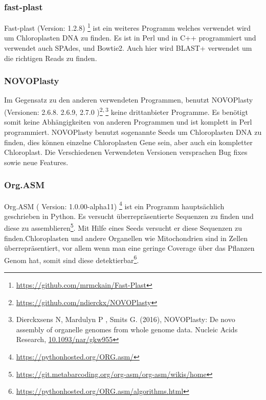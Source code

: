 \documentclass{scrartcl}
\begin{document}
\subsubsection{fast-plast}
\label{sec-2-5-2}
Fast-plast  (Version: 1.2.8) \footnote{\url{https://github.com/mrmckain/Fast-Plast}} ist ein weiteres Programm welches verwendet wird um Chloroplasten DNA zu finden. Es ist in Perl und in C++ programmiert und verwendet auch SPAdes, 
und Bowtie2\footnotemark[19]{}. Auch hier wird BLAST+\footnotemark[22]{} verwendet um die richtigen Reads zu finden. 
\subsubsection{NOVOPlasty}
\label{sec-2-5-3}
Im Gegensatz zu den anderen verwendeten Programmen, benutzt NOVOPlasty (Versionen: 2.6.8. 2.6.9, 2.7.0 )\footnote{\url{https://github.com/ndierckx/NOVOPlasty}}\textsuperscript{,}\,\footnote{Dierckxsens N, Mardulyn P , Smits G. (2016), NOVOPlasty: De novo assembly of organelle genomes from whole genome data. Nucleic Acids Research, \url{10.1093/nar/gkw955}} keine drittanbieter Programme. Es benötigt somit keine Abhängigkeiten von anderen Programmen
und ist komplett in Perl programmiert. NOVOPlasty benutzt sogenannte Seeds um Chloroplasten DNA zu finden, dies können einzelne Chloroplasten Gene sein, aber auch ein kompletter Chloroplast.
Die Verschiedenen Verwendeten Versionen versprachen Bug fixes sowie neue Features. 
\subsubsection{Org.ASM}
\label{sec-2-5-4}
Org.ASM ( Version: 1.0.00-alpha11) \footnote{\url{https://pythonhosted.org/ORG.asm/}} ist ein Programm hauptsächlich geschrieben in Python. Es versucht überrepräsentierte Sequenzen zu finden und diese zu assemblieren\footnote{\url{https://git.metabarcoding.org/org-asm/org-asm/wikis/home}}. 
Mit Hilfe eines Seeds versucht er diese Sequenzen zu finden.Chloroplasten und andere Organellen wie Mitochondrien sind in Zellen überrepräsentiert, vor allem
wenn man eine geringe Coverage über das Pflanzen Genom hat, somit sind diese detektierbar\footnote{\url{https://pythonhosted.org/ORG.asm/algorithms.html}}.
\end{document}
